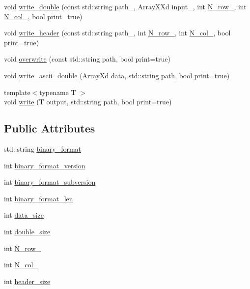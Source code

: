\begin{DoxyCompactItemize}
void \mbox{\hyperlink{class_i_o_a9a648215dc5e33abe2c5a8916fff06d4}{write\+\_\+double}} (const std\+::string path\+\_\+, Array\+X\+Xd input\+\_\+, int \mbox{\hyperlink{class_i_o_ab8aa1490df2e2e758766030afdae3a40}{N\+\_\+row\+\_\+}}, int \mbox{\hyperlink{class_i_o_a64aae2d2be35348233f8ddac4d6791f2}{N\+\_\+col\+\_\+}}, bool print=true)
\item 
void \mbox{\hyperlink{class_i_o_a0db950886bb1e6d5571330f771974c4e}{write\+\_\+header}} (const std\+::string path\+\_\+, int \mbox{\hyperlink{class_i_o_ab8aa1490df2e2e758766030afdae3a40}{N\+\_\+row\+\_\+}}, int \mbox{\hyperlink{class_i_o_a64aae2d2be35348233f8ddac4d6791f2}{N\+\_\+col\+\_\+}}, bool print=true)
\item 
void \mbox{\hyperlink{class_i_o_a0fd7211866348cd3acc26d1ed17c100c}{overwrite}} (const std\+::string path, bool print=true)
\item 
void \mbox{\hyperlink{class_i_o_a20602422f0a6615b265c96fc02523e6f}{write\+\_\+ascii\+\_\+double}} (Array\+Xd data, std\+::string path, bool print=true)
\item 
{\footnotesize template$<$typename T $>$ }\\void \mbox{\hyperlink{class_i_o_ac84ca0cd185f0df4ea871710120577d6}{write}} (T output, std\+::string path, bool print=true)
\end{DoxyCompactItemize}
\subsection*{Public Attributes}
\begin{DoxyCompactItemize}
\item 
std\+::string \mbox{\hyperlink{class_i_o_a254c13a437051a09be72f77173017576}{binary\+\_\+format}}
\item 
int \mbox{\hyperlink{class_i_o_aaf91ba1d8be1503b44b2b1b1b666303b}{binary\+\_\+format\+\_\+version}}
\item 
int \mbox{\hyperlink{class_i_o_ad5c0c344b35565bb355c5d714121787b}{binary\+\_\+format\+\_\+subversion}}
\item 
int \mbox{\hyperlink{class_i_o_a2a1699a4cde1ce8631ae0309bc75d336}{binary\+\_\+format\+\_\+len}}
\item 
int \mbox{\hyperlink{class_i_o_a39a8a0474a288522d847f6be0fb2403f}{data\+\_\+size}}
\item 
int \mbox{\hyperlink{class_i_o_a3af3bf77eacd18c1c50cbf78b46c4228}{double\+\_\+size}}
\item 
int \mbox{\hyperlink{class_i_o_ab8aa1490df2e2e758766030afdae3a40}{N\+\_\+row\+\_\+}}
\item 
int \mbox{\hyperlink{class_i_o_a64aae2d2be35348233f8ddac4d6791f2}{N\+\_\+col\+\_\+}}
\item 
int \mbox{\hyperlink{class_i_o_aee540c40b18d5f9990bf8d7e12cb0827}{header\+\_\+size}}
\end{DoxyCompactItemize}


